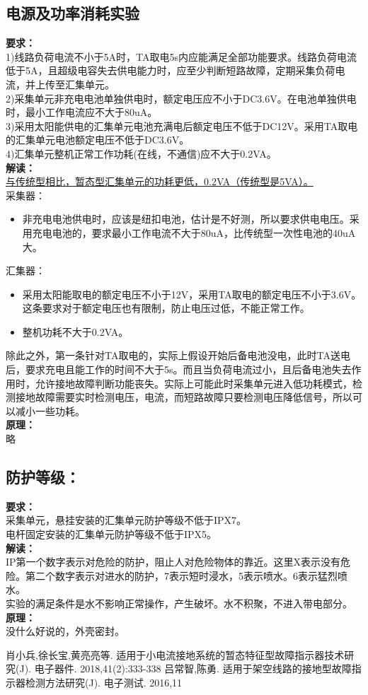 \documentclass{article}
\begin{document}
\begin{CJK}{UTF8}{gbsn}
\subsection{ 电源及功率消耗实验}
	\par
	\textbf{要求：}\\
	1)线路负荷电流不小于5A时，TA取电5s内应能满足全部功能要求。线路负荷电流低于5A，且超级电容失去供电能力时，应至少判断短路故障，定期采集负荷电流，并上传至汇集单元。\\
	2)采集单元非充电电池单独供电时，额定电压应不小于DC3.6V。在电池单独供电时，最小工作电流应不大于80uA。\\
	3)采用太阳能供电的汇集单元电池充满电后额定电压不低于DC12V。采用TA取电的汇集单元电池额定电压不低于DC3.6V。\\
	4)汇集单元整机正常工作功耗(在线，不通信)应不大于0.2VA。\\
	\textbf{解读：}\\
	\underline{与传统型相比，暂态型汇集单元的功耗更低，0.2VA（传统型是5VA）。}\\
	采集器：
	\begin{itemize}
			\item 非充电电池供电时，应该是纽扣电池，估计是不好测，所以要求供电电压。采用充电电池的，要求最小工作电流不大于80uA，比传统型一次性电池的40uA大。
	\end{itemize}
	汇集器：
	\begin{itemize}
			\item 采用太阳能取电的额定电压不小于12V，采用TA取电的额定电压不小于3.6V。这条要求对于额定电压也有限制，防止电压过低，不能正常工作。
			\item 整机功耗不大于0.2VA。
	\end{itemize}
	除此之外，第一条针对TA取电的，实际上假设开始后备电池没电，此时TA送电后，要求充电且能工作的时间不大于5s。而且当负荷电流过小，且后备电池失去作用时，允许接地故障判断功能丧失。实际上可能此时采集单元进入低功耗模式，检测接地故障需要实时检测电压，电流，而短路故障只要检测电压降低信号，所以可以减小一些功耗。\\
	\textbf{原理：}\\
	略
\subsection{ 防护等级：}
	\par
	\textbf{要求：}\\
	采集单元，悬挂安装的汇集单元防护等级不低于IPX7。\\
	电杆固定安装的汇集单元防护等级不低于IPX5。\\
	\textbf{解读：}\\
	IP第一个数字表示对危险的防护，阻止人对危险物体的靠近。这里X表示没有危险。第二个数字表示对进水的防护，7表示短时浸水，5表示喷水。6表示猛烈喷水。\\
	实验的满足条件是水不影响正常操作，产生破坏。水不积聚，不进入带电部分。\\
	\textbf{原理：}\\
	没什么好说的，外壳密封。
	
\begin{thebibliography}{99}
肖小兵,徐长宝,黄亮亮等. 适用于小电流接地系统的暂态特征型故障指示器技术研究(J). 电子器件. 2018,41(2):333-338
吕常智,陈勇. 适用于架空线路的接地型故障指示器检测方法研究(J). 电子测试. 2016,11
\end{thebibliography}
\end{CJK}
\end{document}
